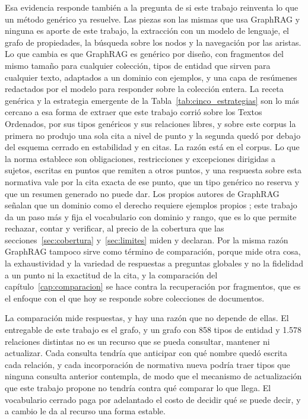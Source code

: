\documentclass[12pt,a4paper]{report}
\begin{document}
Esa evidencia responde también a la pregunta de si este trabajo reinventa lo que un método genérico ya resuelve. Las piezas son las mismas que usa GraphRAG y ninguna es aporte de este trabajo, la extracción con un modelo de lenguaje, el grafo de propiedades, la búsqueda sobre los nodos y la navegación por las aristas. Lo que cambia es que GraphRAG es genérico por diseño, con fragmentos del mismo tamaño para cualquier colección, tipos de entidad que sirven para cualquier texto, adaptados a un dominio con ejemplos, y una capa de resúmenes redactados por el modelo para responder sobre la colección entera. La receta genérica y la estrategia emergente de la Tabla~\ref{tab:cinco_estrategias} son lo más cercano a esa forma de extraer que este trabajo corrió sobre los Textos Ordenados, por sus tipos genéricos y sus relaciones libres, y sobre este corpus la primera no produjo una sola cita a nivel de punto y la segunda quedó por debajo del esquema cerrado en estabilidad y en citas. La razón está en el corpus. Lo que la norma establece son obligaciones, restricciones y excepciones dirigidas a sujetos, escritas en puntos que remiten a otros puntos, y una respuesta sobre esta normativa vale por la cita exacta de ese punto, que un tipo genérico no reserva y que un resumen generado no puede dar. Los propios autores de GraphRAG señalan que un dominio como el derecho requiere ejemplos propios \cite{edge2024graphrag}; este trabajo da un paso más y fija el vocabulario con dominio y rango, que es lo que permite rechazar, contar y verificar, al precio de la cobertura que las secciones~\ref{sec:cobertura} y~\ref{sec:limites} miden y declaran. Por la misma razón GraphRAG tampoco sirve como término de comparación, porque mide otra cosa, la exhaustividad y la variedad de respuestas a preguntas globales y no la fidelidad a un punto ni la exactitud de la cita, y la comparación del capítulo~\ref{cap:comparacion} se hace contra la recuperación por fragmentos, que es el enfoque con el que hoy se responde sobre colecciones de documentos.

La comparación mide respuestas, y hay una razón que no depende de ellas. El entregable de este trabajo es el grafo, y un grafo con 858 tipos de entidad y 1.578 relaciones distintas no es un recurso que se pueda consultar, mantener ni actualizar. Cada consulta tendría que anticipar con qué nombre quedó escrita cada relación, y cada incorporación de normativa nueva podría traer tipos que ninguna consulta anterior contempla, de modo que el mecanismo de actualización que este trabajo propone no tendría contra qué comparar lo que llega. El vocabulario cerrado paga por adelantado el costo de decidir qué se puede decir, y a cambio le da al recurso una forma estable.
\end{document}
